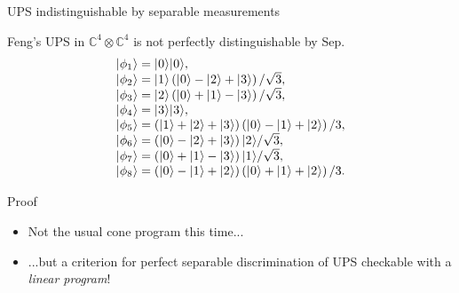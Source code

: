 \documentclass{beamer}
\def\complex{\mathbb{C}}
\newcommand{\microspace}{\mspace{0.5mu}}
\newcommand{\ket}[1]{
  \lvert\microspace #1 \microspace \rangle}
\begin{document}
    \begin{frame}{UPS indistinguishable by separable measurements}
        \begin{theorem}[new]
        Feng's UPS in $\complex^{4}\otimes\complex^{4}$ is not perfectly distinguishable by Sep.
        \begin{equation*}
          \begin{array}{l}
            \ket{\phi_1} = \ket{0}\ket{0}, \\
            \ket{\phi_2} = \ket{1}\left(\ket{0} - \ket{2} + \ket{3}\right)/\sqrt{3},\\
            \ket{\phi_3} = \ket{2}\left(\ket{0} + \ket{1} - \ket{3}\right)/\sqrt{3}, \\
            \ket{\phi_4} = \ket{3}\ket{3}, \\
            \ket{\phi_5} = \left(\ket{1} + \ket{2} + \ket{3}\right)\left(\ket{0}
            - \ket{1} + \ket{2}\right)/3, \\
            \ket{\phi_6} = \left(\ket{0} - \ket{2} + \ket{3}\right)\ket{2}/\sqrt{3}, \\
            \ket{\phi_7} = \left(\ket{0} + \ket{1} - \ket{3}\right)\ket{1}/\sqrt{3}, \\
            \ket{\phi_8} = \left(\ket{0} - \ket{1} + \ket{2}\right)\left(\ket{0}
            + \ket{1} + \ket{2}\right)/3.
          \end{array}
        \end{equation*}
        \end{theorem}
        \vspace{-10pt}
        \begin{block}{Proof}
          \begin{itemize}
              \item Not the usual cone program this time... 
              \item ...but a criterion for perfect separable discrimination of UPS
                  checkable with a \emph{linear program}!
          \end{itemize}
        \end{block}       
    \end{frame}
\end{document}
